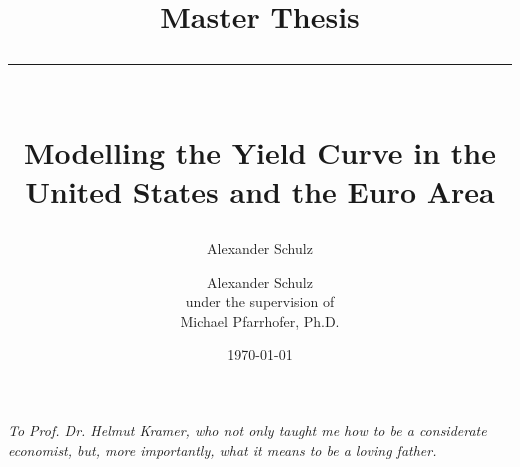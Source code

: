 \documentclass[12pt, a4paper]{article}
\title{%
    \textbf{Master Thesis}
    \par\noindent\rule{\textwidth}{0.4pt}
    \\ [1em]
    Modelling the Yield Curve in the United States and the Euro Area}
\author{ \Large Alexander Schulz }
\author{\Large{Alexander Schulz}\\[1em]
\small{under the supervision of}\\[1em]
\large{Michael Pfarrhofer, Ph.D.}}
\date{\today}
\begin{document}
\maketitle
\thispagestyle{empty}
\pagebreak
\newpage\null
\thispagestyle{empty}


\begin{center}
    \justifying
    \textit{To Prof. Dr. Helmut Kramer, who not only taught me how to be a considerate economist, but, more importantly, what it means to be a loving father.}
\end{center}




\pagebreak
\tableofcontents
\thispagestyle{empty}
\pagebreak
\listoffigures
\thispagestyle{empty}
\listoftables
\thispagestyle{empty}

\clearpage
{}

\setlength{\parindent}{0em}
\setlength{\parskip}{1em}


\newpage

















\pagebreak
{}
\label{sec:references}
\nocite{*}
\printbibliography


\pagebreak
\appendix
\newpage

\end{document}
